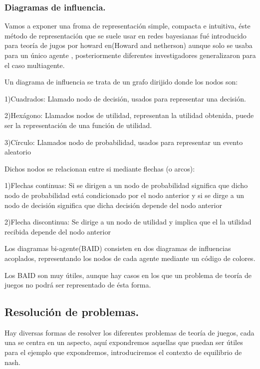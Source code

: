 \documentclass[a4paper]{report} %
\begin{document}
\subsubsection{Diagramas de influencia.}

Vamos a exponer una froma de representación simple, compacta e intuitiva, éste método de representación que se suele usar en redes bayesianas fué introducido para teoría de jugos por howard en(Howard and netherson)%
aunque solo se usaba para un único agente , posteriormente diferentes   investigadores generalizaron para el caso multiagente.

Un diagrama de influencia se trata de un grafo dirijido donde los nodos son:

1)Cuadrados: Llamado nodo de decisión, usados para representar una decisión.

2)Hexágono: Llamados nodos de utilidad, representan la utilidad obtenida, puede ser la representación de una función de utilidad.

3)Círculo: Llamados nodo de probabilidad, usados para representar un evento aleatorio

Dichos nodos se relacionan entre si mediante flechas (o arcos):

1)Flechas continuas: Si se dirigen a un nodo de probabilidad significa que dicho nodo de probabilidad está condicionado por el nodo anterior y si se dirge a un nodo de decisión significa que dicha decisión depende del nodo anterior

2)Flecha discontinua: Se dirige a un nodo de utilidad y implica que el la utilidad recibida depende del nodo anterior


Los diagramas bi-agente(BAID) consisten en dos diagramas de influencias acoplados, representando los nodos de cada agente mediante un código de colores.


Los BAID son muy útiles, aunque hay casos en los que un problema de teoría de juegos no podrá ser representado de ésta forma. 

\subsection{Resolución de problemas.}

Hay diversas formas de resolver los diferentes problemas de teoría de juegos, cada una se centra en un aspecto, aquí expondremos aquellas que puedan ser útiles para el ejemplo que expondremos, introduciremos el contexto de equilibrio de nash.
\end{document}
